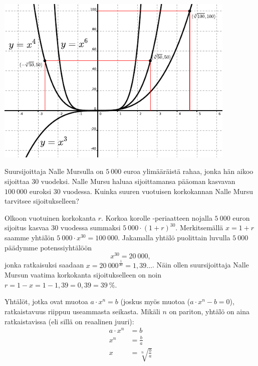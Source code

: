 \begin{esimerkki}
	\begin{alakohdat}
	\end{alakohdat}
	\begin{center}
		\includegraphics[width=11.5cm]{pictures/xpot346.pdf}
	\end{center}
\end{esimerkki}


\begin{esimerkki}
	Suursijoittaja Nalle Mursulla on $5~000$ euroa ylimääräistä rahaa, jonka hän aikoo sijoittaa $30$ vuodeksi.  Nalle Mursu haluaa sijoittamansa pääoman kasvavan $100~000$ euroksi $30$ vuodessa.  Kuinka suuren vuotuisen korkokannan Nalle Mursu tarvitsee sijoitukselleen? 
	\begin{esimratk}
		Olkoon vuotuinen korkokanta $r$. Korkoa korolle -periaatteen nojalla $5~000$ euron sijoitus
		kasvaa $30$ vuodessa summaksi $5~000\cdot(1+r)^{30}$. Merkitsemällä $x=1+r$ saamme yhtälön $5~000\cdot x^{30} = 100~000$.
		Jakamalla yhtälö puolittain luvulla $5~000$ päädymme potenssiyhtälöön
		\[ x^{30} = 20~000, \] 
		jonka ratkaisuksi saadaan $x=20~000^{\frac{1}{30}} = 1{,}39\ldots$. Näin
		ollen suursijoittaja Nalle Mursun vaatima korkokanta sijoitukselleen on noin $r=1-x=1-1,39=0,39=39~\%$.
	\end{esimratk}
\end{esimerkki}

Yhtälöt, jotka ovat muotoa $a\cdot x^n = b$ (joskus myös muotoa ($a\cdot x^n - b = 0$), ratkaistavuus riippuu useammasta seikasta.
Mikäli $n$ on pariton, yhtälö on aina ratkaistavissa (eli sillä on reaalinen juuri):
\begin{align*}
	a\cdot x^n &= b \\
	x^n &= \frac{b}{a} \\
	x &= \sqrt[n]{\frac{b}{a}}
\end{align*}

